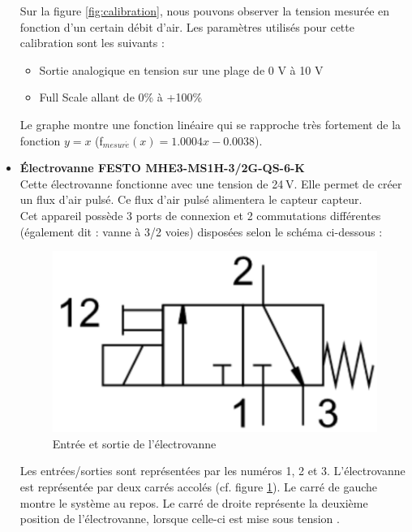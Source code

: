 \begin{itemize}
          Sur la figure \ref{fig:calibration}, nous pouvons observer la tension mesurée en fonction d'un certain débit d'air. Les paramètres utilisés
          pour cette calibration sont les suivants :
          \begin{itemize}
              \item Sortie analogique en tension sur une plage de 0 V à 10 V
              \item Full Scale allant de 0\% à +100\%
          \end{itemize}
          
          Le graphe montre une fonction linéaire qui se rapproche très fortement de la fonction $y = x$ (f$_{mesur\acute{e}}(x) = 1.0004x - 0.0038$).\\
          
    \item \textbf{Électrovanne FESTO MHE3-MS1H-3/2G-QS-6-K}\\
          Cette électrovanne fonctionne avec une tension de 24 V.  Elle permet de créer un flux d'air pulsé. Ce flux d'air pulsé alimentera le
          capteur \gls{capteur}.\\
          Cet appareil possède 3 ports de connexion et 2 commutations différentes (également dit : vanne à 3/2 voies) disposées selon le schéma ci-dessous :
          \begin{figure}[H]
              \centering
              \includegraphics[scale = 0.3]{assets/figures/Electrovanne_InOutput.png}
              \caption{Entrée et sortie de l'électrovanne}
              \label{fig:electrovanne_InOutput}
          \end{figure}
          Les entrées/sorties sont représentées par les numéros 1, 2 et 3. L'électrovanne est représentée par deux carrés accolés (cf. figure
          \ref*{fig:electrovanne_InOutput}). Le carré de gauche montre le système au repos. Le carré de droite représente la deuxième position de
          l'électrovanne, lorsque celle-ci est mise sous tension \cite{mimwebsite}.\\
          

\end{itemize}
